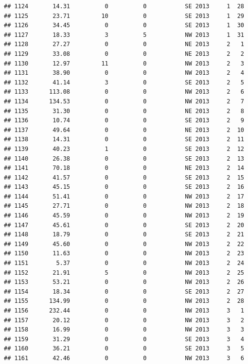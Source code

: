 \documentclass[
]{article}
\begin{document}
\begin{verbatim}
## 1124       14.31          0          0           SE 2013     1  28
## 1125       23.71         10          0           SE 2013     1  29
## 1126       34.45          0          0           SE 2013     1  30
## 1127       18.33          3          5           NW 2013     1  31
## 1128       27.27          0          0           NE 2013     2   1
## 1129       33.08          0          0           NE 2013     2   2
## 1130       12.97         11          0           NW 2013     2   3
## 1131       38.90          0          0           NW 2013     2   4
## 1132       41.14          3          0           SE 2013     2   5
## 1133      113.08          0          0           NW 2013     2   6
## 1134      134.53          0          0           NW 2013     2   7
## 1135       31.30          0          0           NE 2013     2   8
## 1136       10.74          0          0           SE 2013     2   9
## 1137       49.64          0          0           NE 2013     2  10
## 1138       14.31          0          0           SE 2013     2  11
## 1139       40.23          1          0           SE 2013     2  12
## 1140       26.38          0          0           SE 2013     2  13
## 1141       70.18          0          0           NE 2013     2  14
## 1142       41.57          0          0           SE 2013     2  15
## 1143       45.15          0          0           SE 2013     2  16
## 1144       51.41          0          0           NW 2013     2  17
## 1145       27.71          0          0           NW 2013     2  18
## 1146       45.59          0          0           NW 2013     2  19
## 1147       45.61          0          0           SE 2013     2  20
## 1148       18.79          0          0           SE 2013     2  21
## 1149       45.60          0          0           NW 2013     2  22
## 1150       11.63          0          0           NW 2013     2  23
## 1151        5.37          0          0           NW 2013     2  24
## 1152       21.91          5          0           NW 2013     2  25
## 1153       53.21          0          0           NW 2013     2  26
## 1154       18.34          0          0           SE 2013     2  27
## 1155      134.99          0          0           NW 2013     2  28
## 1156      232.44          0          0           NW 2013     3   1
## 1157       20.12          0          0           NW 2013     3   2
## 1158       16.99          0          0           NW 2013     3   3
## 1159       31.29          0          0           SE 2013     3   4
## 1160       36.21          0          0           SE 2013     3   5
## 1161       42.46          0          0           NW 2013     3   6

\end{verbatim}
\end{document}

